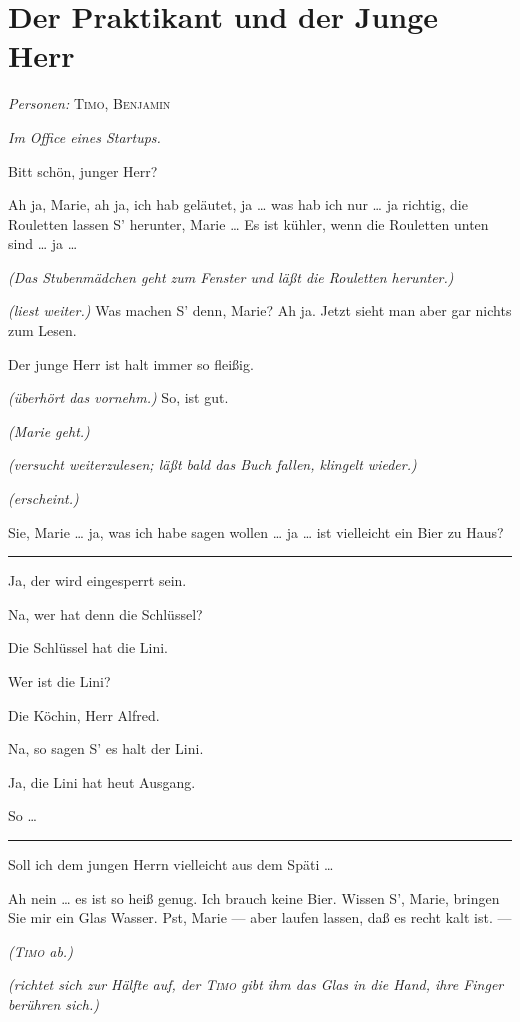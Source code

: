 \documentclass[
	final,
	a4paper,
	ngerman,
	mpinclude = true, %
	twoside = true,
	open = right,
	cleardoublepage = plain,
	DIV = 13,
	BCOR = 1cm,
	titlepage = firstiscover,
	]{scrbook}
\newcommand{\scene}{\section}
\newcommand{\direction}[1]{\textit{(#1)}}
\newcommand{\setting}[1]{\vspace{-0.5\baselineskip}\centering\textit{#1}}
\newenvironment{deletion}{%
		\vspace{0.25\baselineskip}
		\hrule
		\vspace{0.25\baselineskip}
		\color{darkgray}
	}{
		\color{black}
		\vspace{0.25\baselineskip}
		\hrule 
		\vspace{0.25\baselineskip}
	}
\newcommand{\characterlist}[1]{{\begin{center}\textit{Personen:} #1\end{center}}}
\newcommand{\thecharacter}[1]{\textup{\textsc{#1}}\xspace}
\newcommand{\thepraktikant}{\thecharacter{Timo}}
\newcommand{\theherr}{\thecharacter{Benjamin}}
\newcommand{\character}[1]{\item[#1:]}
\newcommand{\praktikant}{\character{\thepraktikant}}
\newcommand{\herr}{\character{\theherr}}
\begin{document}
\scene{Der Praktikant und der Junge Herr}
\characterlist{\thepraktikant, \theherr}
\setting{Im Office eines Startups.}
\begin{play}
	\praktikant
	Bitt schön, junger Herr?

	\herr
	Ah ja, Marie, ah ja, ich hab geläutet, ja \ldots{} was hab ich nur \ldots{} ja richtig, die Rouletten lassen S' herunter, Marie \ldots{} Es ist kühler, wenn die Rouletten unten sind \ldots{} ja \ldots{}

	\direction{Das Stubenmädchen geht zum Fenster und läßt die Rouletten herunter.}

	\herr
	\direction{liest weiter.} Was machen S' denn, Marie? Ah ja. Jetzt sieht man aber gar nichts zum Lesen.

	\praktikant
	Der junge Herr ist halt immer so fleißig.

	\herr
	\direction{überhört das vornehm.} So, ist gut.

	\direction{Marie geht.}

	\herr
	\direction{versucht weiterzulesen; läßt bald das Buch fallen, klingelt wieder.}

	\praktikant
	\direction{erscheint.}

	\herr
	Sie, Marie \ldots{} ja, was ich habe sagen wollen \ldots{} ja \ldots{} ist vielleicht ein Bier zu Haus?

	\begin{deletion}
	\praktikant
	Ja, der wird eingesperrt sein.

	\herr
	Na, wer hat denn die Schlüssel?

	\praktikant
	Die Schlüssel hat die Lini.

	\herr
	Wer ist die Lini?

	\praktikant
	Die Köchin, Herr Alfred.

	\herr
	Na, so sagen S' es halt der Lini.

	\praktikant
	Ja, die Lini hat heut Ausgang.

	\herr
	So \ldots{}
	\end{deletion}

	\praktikant
	Soll ich dem jungen Herrn vielleicht aus dem Späti \ldots{}

	\herr
	Ah nein \ldots{} es ist so heiß genug. Ich brauch keine Bier. Wissen S', Marie, bringen Sie mir ein Glas Wasser. Pst, Marie --- aber laufen lassen, daß es recht kalt ist. ---

	\direction{\thepraktikant{} ab.}

	\herr
	\direction{richtet sich zur Hälfte auf, der \thepraktikant{} gibt ihm das Glas in die Hand, ihre Finger berühren sich.}


\end{play}
\end{document}
